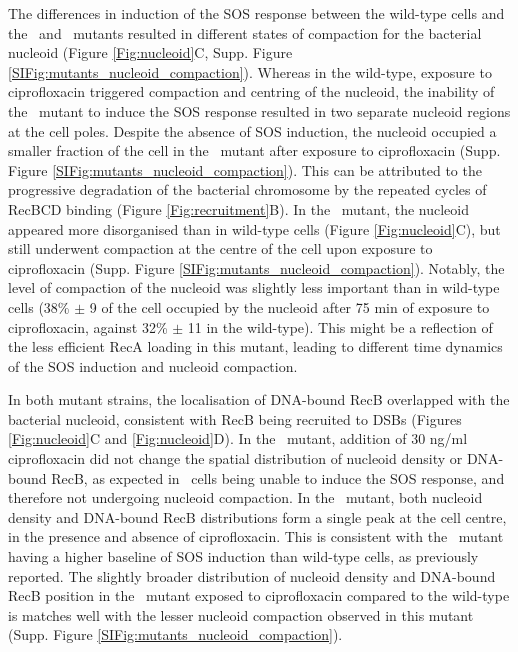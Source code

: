 The differences in induction of the SOS response between the wild-type cells and the \dreca\ and \geneteneighty\ mutants resulted in different states of compaction for the bacterial nucleoid (Figure \ref{Fig:nucleoid}C, Supp. Figure \ref{SIFig:mutants_nucleoid_compaction}). Whereas in the wild-type, exposure to ciprofloxacin triggered compaction and centring of the nucleoid, the inability of the \dreca\ mutant to induce the SOS response resulted in two separate nucleoid regions at the cell poles. Despite the absence of SOS induction, the nucleoid occupied a smaller fraction of the cell in the \dreca\ mutant after exposure to ciprofloxacin (Supp. Figure \ref{SIFig:mutants_nucleoid_compaction}). This can be attributed to the progressive degradation of the bacterial chromosome by the repeated cycles of RecBCD binding (Figure \ref{Fig:recruitment}B). In the \geneteneighty\ mutant, the nucleoid appeared more disorganised than in wild-type cells (Figure \ref{Fig:nucleoid}C), but still underwent compaction at the centre of the cell upon exposure to ciprofloxacin (Supp. Figure \ref{SIFig:mutants_nucleoid_compaction}). Notably, the level of compaction of the nucleoid was slightly less important than in wild-type cells (38\% $\pm$ 9 of the cell occupied by the nucleoid after 75 min of exposure to ciprofloxacin, against 32\% $\pm$ 11 in the wild-type). This might be a reflection of the less efficient RecA loading in this mutant, leading to different time dynamics of the SOS induction and nucleoid compaction.

In both mutant strains, the localisation of DNA-bound RecB overlapped with the bacterial nucleoid, consistent with RecB being recruited to DSBs (Figures \ref{Fig:nucleoid}C and \ref{Fig:nucleoid}D). In the \dreca\ mutant, addition of 30 ng/ml ciprofloxacin did not change the spatial distribution of nucleoid density or DNA-bound RecB, as expected in \dreca\ cells being unable to induce the SOS response, and therefore not undergoing nucleoid compaction. In the \geneteneighty\ mutant, both nucleoid density and DNA-bound RecB distributions form a single peak at the cell centre, in the presence and absence of ciprofloxacin. This is consistent with the \geneteneighty\ mutant having a higher baseline of SOS induction than wild-type cells, as previously reported\cite{Lepore2023}. The slightly broader distribution of nucleoid density and DNA-bound RecB position in the \geneteneighty\ mutant exposed to ciprofloxacin compared to the wild-type is matches well with the lesser nucleoid compaction observed in this mutant (Supp. Figure \ref{SIFig:mutants_nucleoid_compaction}).

